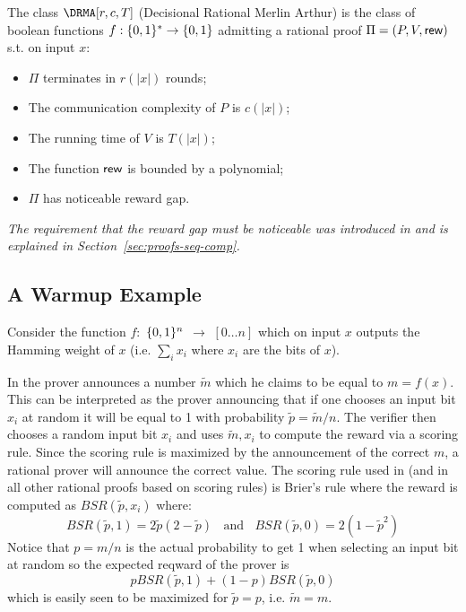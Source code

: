 



\begin{definition}
The class $\DRMA[r, c, T]$ (Decisional Rational Merlin Arthur)
is the class of boolean functions $f : \{0, 1\}^{*} \to \{0, 1\}$ admitting a rational proof $\Pi = (P,V, \mathsf{rew})$ s.t. on input $x$:
\begin{itemize}
    \item $\Pi$ terminates in $r(|x|)$ rounds;
    \item The communication complexity of $P$ is $c(|x|)$;
    \item The running time of $V$ is $T(|x|)$;
    \item The function $\mathsf{rew}$ is bounded by a polynomial;
    \item $\Pi$ has noticeable reward gap.
\end{itemize}
\end{definition}

\noindent
\begin{remark}
\label{rem:asy}
{\em The requirement that the reward gap must be noticeable was introduced in 
\cite{am1,ratargs} and is explained in Section~\ref{sec:proofs-seq-comp}.}
\end{remark}

\subsection{A Warmup Example}
\label{sec:example}

Consider the function $f:$ $\{0, 1\}^n$ $\to$ $[0 \ldots n]$ which on input $x$ outputs the 
Hamming weight of $x$ (i.e. $\sum_{i} x_i$ where $x_i$ are the bits of $x$). 

In \cite{am1} the prover announces a number $\tilde{m}$ which he claims to be equal to $m=f(x)$. This can be interpreted as the prover announcing that if one chooses an input bit $x_i$ at random it will be equal to 1 with probability $\tilde{p}=\tilde{m}/n$. The verifier then chooses a random input bit $x_i$ and uses $\tilde{m},x_i$ to compute the reward via a scoring rule. Since the scoring rule is maximized by the announcement of the correct $m$, a rational prover will announce the correct value. The scoring rule used in \cite{am1} (and in all other rational proofs based on scoring rules) is 
Brier's rule where the reward is computed as $BSR(\tilde{p},x_i)$ where: 
\[BSR(\tilde{p},1) = 2\tilde{p}(2-\tilde{p}) \; \; \mbox{ and } \;\; 
BSR(\tilde{p},0) = 2(1-\tilde{p}^2) \]
Notice that $p=m/n$ is the actual probability to get 1 when selecting an input bit at random so the expected reqward of the prover is 
\begin{equation}
\label{eq:bsr}
p BSR(\tilde{p},1) + (1-p) BSR(\tilde{p},0) 
\end{equation}
which is easily seen to be maximized for $\tilde{p}=p$, i.e. $\tilde{m}=m$. 

